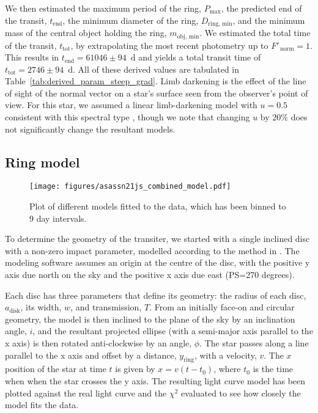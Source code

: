 \documentclass[letter]{aa} %
\begin{document}
We then estimated the maximum period of the ring, $P_{\ensuremath{\mathrm{max}}}$, the predicted end of the transit, $t_{\ensuremath{\mathrm{end}}}$, the minimum diameter of the ring, $D_{\ensuremath{\mathrm{ring, \,min}}}$, and the minimum mass of the central object holding the ring, $m_{\ensuremath{\mathrm{obj, \,min}}}$.
%
We estimated the total time of the transit, $t_{\ensuremath{\mathrm{tot}}}$, by extrapolating the most recent photometry up to $F'_{\mathrm{ \,norm}}=1$.
%
This results in $t_{\ensuremath{\mathrm{end}}}=61046\pm 94$\ d and yields a total transit time of $t_{\ensuremath{\mathrm{tot}}}=2746\pm 94$\ d. 
%
All of these derived values are tabulated in Table~\ref{tab:derived_param_steep_grad}.
%
Limb darkening is the effect of the line of sight of the normal vector on a star's surface seen from the observer's point of view.
%
For this star, we assumed a linear limb-darkening model with $u=0.5$ consistent with this spectral type \citep{Sing10}, though we note that changing $u$ by 20\% does not significantly change the resultant models.

\subsection{Ring model}
\label{subsec:create_ring}

\begin{figure}[hbt]
\centering
    \texttt{[image: figures/asassn21js\_combined\_model.pdf]}
    \caption{Plot of different models fitted to the data, which has been binned to 9 day intervals.}
    \label{fig:model_combine}
\end{figure}

To determine the geometry of the transiter, we started with a single inclined disc with a non-zero impact parameter, modelled according to the method in \citet{Kenworthy_2015}.
%
The modeling software assumes an origin at the centre of the disc, with the positive y axis due north on the sky and the positive x axis due east (PS=270 degrees).

Each disc has three parameters that define its geometry: the radius of each disc, $a_{\mathrm{disk}}$, its width, $w$, and transmission, $T$.
%
From an initially face-on and circular geometry, the model is then inclined to the plane of the sky by an inclination angle, $i$, and the resultant projected ellipse (with a semi-major axis parallel to the x axis) is then rotated anti-clockwise by an angle, $\phi$.
%
The star passes along a line parallel to the x axis and offset by a distance, $y_{\ensuremath{\mathrm{ring}}}$, with a velocity, $v$.
%
The $x$ position of the star at time $t$ is given by $x=v(t-t_0)$, where $t_0$ is the time when when the star crosses the y axis.
%
The resulting light curve model has been plotted against the real light curve and the $\chi^2$ evaluated to see how closely the model fits the data.
\end{document}
